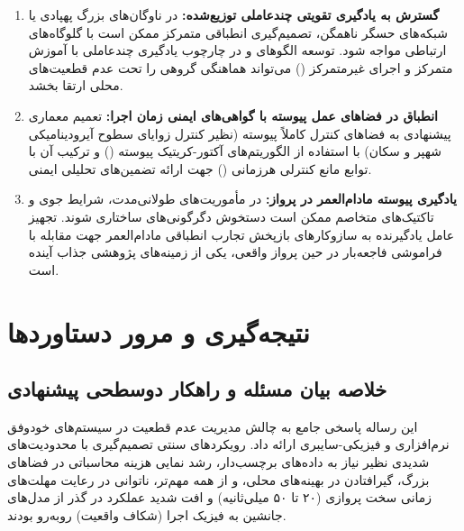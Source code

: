 \documentclass[oneside,openany,phd]{TMU-Thesis}
\begin{document}
\begin{enumerate}
  \item \textbf{گسترش به یادگیری تقویتی چندعاملی توزیع‌شده:} در ناوگان‌های بزرگ پهپادی یا شبکه‌های حسگر ناهمگن، تصمیم‌گیری انطباقی متمرکز ممکن است با گلوگاه‌های ارتباطی مواجه شود. توسعه الگوهای \sgos و \caepv در چارچوب یادگیری چندعاملی با آموزش متمرکز و اجرای غیرمتمرکز () می‌تواند هماهنگی گروهی را تحت عدم قطعیت‌های محلی ارتقا بخشد.
  \item \textbf{انطباق در فضاهای عمل پیوسته با گواهی‌های ایمنی زمان اجرا:} تعمیم معماری پیشنهادی به فضاهای کنترل کاملاً پیوسته (نظیر کنترل زوایای سطوح آیرودینامیکی شهپر و سکان) با استفاده از الگوریتم‌های آکتور-کریتیک پیوسته () و ترکیب آن با توابع مانع کنترلی هرزمانی () جهت ارائه تضمین‌های تحلیلی ایمنی.
  \item \textbf{یادگیری پیوسته مادام‌العمر در پرواز:} در مأموریت‌های طولانی‌مدت، شرایط جوی و تاکتیک‌های متخاصم ممکن است دستخوش دگرگونی‌های ساختاری شوند. تجهیز عامل یادگیرنده به سازوکارهای بازپخش تجارب انطباقی مادام‌العمر جهت مقابله با فراموشی فاجعه‌بار در حین پرواز واقعی، یکی از زمینه‌های پژوهشی جذاب آینده است.
\end{enumerate}

\section{نتیجه‌گیری و مرور دستاوردها}

\subsection{خلاصه بیان مسئله و راهکار دوسطحی پیشنهادی}

این رساله پاسخی جامع به چالش مدیریت عدم قطعیت در سیستم‌های خودوفق نرم‌افزاری و فیزیکی-سایبری ارائه داد. رویکردهای سنتی تصمیم‌گیری با محدودیت‌های شدیدی نظیر نیاز به داده‌های برچسب‌دار، رشد نمایی هزینه محاسباتی در فضاهای بزرگ، گیرافتادن در بهینه‌های محلی، و از همه مهم‌تر، ناتوانی در رعایت مهلت‌های زمانی سخت پروازی (۲۰ تا ۵۰ میلی‌ثانیه) و افت شدید عملکرد در گذر از مدل‌های جانشین به فیزیک اجرا (شکاف واقعیت) روبه‌رو بودند.
\end{document}
